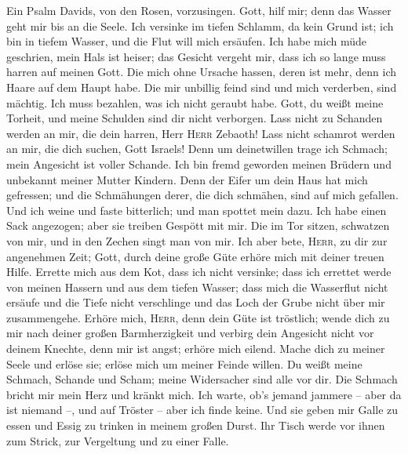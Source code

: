  Ein Psalm Davids, von den Rosen, vorzusingen.
 Gott, hilf mir; denn das Wasser geht mir bis an die
Seele.  Ich versinke im tiefen Schlamm, da kein Grund ist;
ich bin in tiefem Wasser, und die Flut will mich ersäufen.
 Ich habe mich müde geschrien, mein Hals ist heiser; das
Gesicht vergeht mir, dass ich so lange muss harren auf meinen Gott.
 Die mich ohne Ursache hassen, deren ist mehr, denn ich
Haare auf dem Haupt habe. Die mir unbillig feind sind und mich
verderben, sind mächtig. Ich muss bezahlen, was ich nicht geraubt habe.
 Gott, du weißt meine Torheit, und meine Schulden sind dir
nicht verborgen.  Lass nicht zu Schanden werden an mir,
die dein harren, Herr \textsc{Herr} Zebaoth! Lass nicht schamrot werden
an mir, die dich suchen, Gott Israels!  Denn um
deinetwillen trage ich Schmach; mein Angesicht ist voller Schande.
 Ich bin fremd geworden meinen Brüdern und unbekannt
meiner Mutter Kindern.  Denn der Eifer um dein Haus hat
mich gefressen; und die Schmähungen derer, die dich schmähen, sind auf
mich gefallen.  Und ich weine und faste bitterlich; und
man spottet mein dazu.  Ich habe einen Sack angezogen;
aber sie treiben Gespött mit mir.  Die im Tor sitzen,
schwatzen von mir, und in den Zechen singt man von mir. 
Ich aber bete, \textsc{Herr}, zu dir zur angenehmen Zeit; Gott, durch
deine große Güte erhöre mich mit deiner treuen Hilfe. 
Errette mich aus dem Kot, dass ich nicht versinke; dass ich errettet
werde von meinen Hassern und aus dem tiefen Wasser;  dass
mich die Wasserflut nicht ersäufe und die Tiefe nicht verschlinge und
das Loch der Grube nicht über mir zusammengehe.  Erhöre
mich, \textsc{Herr}, denn dein Güte ist tröstlich; wende dich zu mir
nach deiner großen Barmherzigkeit  und verbirg dein
Angesicht nicht vor deinem Knechte, denn mir ist angst; erhöre mich
eilend.  Mache dich zu meiner Seele und erlöse sie;
erlöse mich um meiner Feinde willen.  Du weißt meine
Schmach, Schande und Scham; meine Widersacher sind alle vor dir.
 Die Schmach bricht mir mein Herz und kränkt mich. Ich
warte, ob's jemand jammere -- aber da ist niemand --, und auf Tröster --
aber ich finde keine.  Und sie geben mir Galle zu essen
und Essig zu trinken in meinem großen Durst.  Ihr Tisch
werde vor ihnen zum Strick, zur Vergeltung und zu einer Falle.
